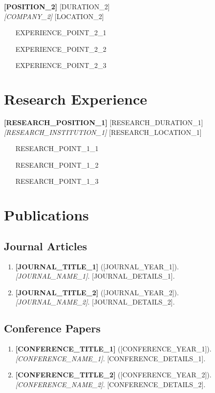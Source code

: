 \documentclass[11pt,a4paper]{article}
\newcommand{\cventry}[4]{
    \textbf{#1} \hfill #2 \\
    \textit{#3} \hfill #4 \\
    \vspace{0.1cm}
}
\newcommand{\cvpublication}[4]{
    \textbf{#1} (#2). \textit{#3}. #4.
}
\begin{document}
\cventry{[POSITION_2]}{[DURATION_2]}{[COMPANY_2]}{[LOCATION_2]}
\begin{itemize}[leftmargin=0.2in]
    \item [EXPERIENCE_POINT_2_1]
    \item [EXPERIENCE_POINT_2_2]
    \item [EXPERIENCE_POINT_2_3]
\end{itemize}

\section{Research Experience}
\cventry{[RESEARCH_POSITION_1]}{[RESEARCH_DURATION_1]}{[RESEARCH_INSTITUTION_1]}{[RESEARCH_LOCATION_1]}
\begin{itemize}[leftmargin=0.2in]
    \item [RESEARCH_POINT_1_1]
    \item [RESEARCH_POINT_1_2]
    \item [RESEARCH_POINT_1_3]
\end{itemize}

\section{Publications}
\subsection{Journal Articles}
\begin{enumerate}[leftmargin=0.2in]
    \item \cvpublication{[JOURNAL_TITLE_1]}{[JOURNAL_YEAR_1]}{[JOURNAL_NAME_1]}{[JOURNAL_DETAILS_1]}
    \item \cvpublication{[JOURNAL_TITLE_2]}{[JOURNAL_YEAR_2]}{[JOURNAL_NAME_2]}{[JOURNAL_DETAILS_2]}
\end{enumerate}

\subsection{Conference Papers}
\begin{enumerate}[leftmargin=0.2in]
    \item \cvpublication{[CONFERENCE_TITLE_1]}{[CONFERENCE_YEAR_1]}{[CONFERENCE_NAME_1]}{[CONFERENCE_DETAILS_1]}
    \item \cvpublication{[CONFERENCE_TITLE_2]}{[CONFERENCE_YEAR_2]}{[CONFERENCE_NAME_2]}{[CONFERENCE_DETAILS_2]}
\end{enumerate}
\end{document}
